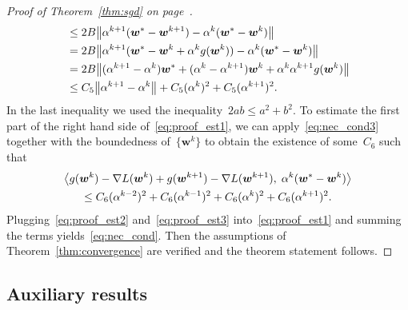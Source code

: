 \begin{proof}[Proof of Theorem~\ref{thm:sgd} on page~\pageref{thm:sgd}]
\begin{equation}
\begin{aligned}
    & \leq 2B\norm{\alpha^{k+1}(\bm{w}^*-\bm{w}^{k+1})-\alpha^k(\bm{w}^*-\bm{w}^{k})} \\
    & = 2B\norm{\alpha^{k+1}(\bm{w}^*-\bm{w}^k+\alpha^kg(\bm{w}^k))-\alpha^k(\bm{w}^*-\bm{w}^{k})} \\
    & = 2B\norm{(\alpha^{k+1}-\alpha^k)\bm{w}^* + (\alpha^k-\alpha^{k+1})\bm{w}^k +\alpha^k\alpha^{k+1} g(\bm{w}^k)} \\
    & \leq C_5 \norm{\alpha^{k+1}-\alpha^k} + C_5(\alpha^k)^2 + C_5(\alpha^{k+1})^2.
    \end{aligned}
  \end{equation}
  In the last inequality we used the inequality~$2ab\leq a^2+b^2$. To estimate the first part of the right hand side of~\eqref{eq:proof_est1}, we can apply~\eqref{eq:nec_cond3} together with the boundedness of~$\{\bm{w}^k\}$ to obtain the existence of some~$C_6$ such that
  \begin{multline}\label{eq:proof_est3}
    \inner{ g(\bm{w}^{k}) -\nabla L(\bm{w}^{k}) + g(\bm{w}^{k+1})-\nabla L(\bm{w}^{k+1})}{\alpha^k(\bm{w}^* - \bm{w}^{k})} \\
      \leq C_6(\alpha^{k-2})^2 + C_6(\alpha^{k-1})^2 + C_6(\alpha^{k})^2 + C_6(\alpha^{k+1})^2.
  \end{multline}
  Plugging~\eqref{eq:proof_est2} and~\eqref{eq:proof_est3} into~\eqref{eq:proof_est1} and summing the terms yields~\eqref{eq:nec_cond}. Then the assumptions of Theorem~\ref{thm:convergence} are verified and the theorem statement follows.
\end{proof}

\subsection{Auxiliary results}\label{app:sgd3}

